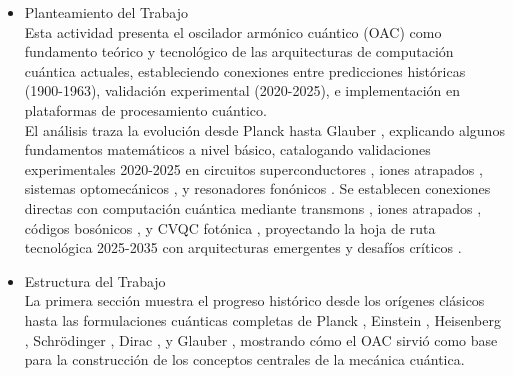 \documentclass[11pt,a4paper,spanish]{book}
\begin{document}
\begin{itemize}
Comprender los nuevos desarrollos que se han dado en el período 2020-2025, requiere entender y dominar el OAC como fundamento, objetivo central de este trabajo. Este periodo ha marcado una transición con desarrollos como: los códigos bosónicos han superado el punto de equilibrio en corrección de errores \cite{sivak2023, ni2023}, cat qubits han alcanzado tiempos de bit-flip superiores a 10 segundos \cite{reglade2024}, sistemas optomecánicos han enfriado osciladores a 0.04 fonones desde temperatura ambiente \cite{dania2025} y creado estados gato en resonadores de 16 microgramos \cite{bild2023}, y resonadores fonónicos han verificado directamente la cuantización de energía \cite{arrangoiz2019, hou2024}.\\ 

\item Planteamiento del Trabajo\\
Esta actividad presenta el oscilador armónico cuántico (OAC) como fundamento teórico y tecnológico de las arquitecturas de computación cuántica actuales, estableciendo conexiones entre predicciones históricas (1900-1963), validación experimental (2020-2025), e implementación en plataformas de procesamiento cuántico. \\

El análisis traza la evolución desde Planck \citep{planck1901} hasta Glauber \citep{glauber1963a}, explicando algunos fundamentos matemáticos a nivel básico, catalogando validaciones experimentales 2020-2025 en circuitos superconductores \citep{sivak2023, ni2023, reglade2024}, iones atrapados \citep{hou2024}, sistemas optomecánicos \citep{dania2025, bild2023}, y resonadores fonónicos \citep{arrangoiz2019, wollack2022}. Se establecen conexiones directas con computación cuántica mediante transmons \citep{koch2007, blais2021}, iones atrapados \citep{cirac1995, bruzewicz2019}, códigos bosónicos \citep{gkp2001, ofek2016, brady2024}, y CVQC fotónica \citep{braunstein2005, madsen2022}, proyectando la hoja de ruta tecnológica 2025-2035 con arquitecturas emergentes y desafíos críticos \citep{liu2024, eickbusch2024, chamberland2022}.

\item Estructura del Trabajo\\
La primera sección muestra el progreso histórico desde los orígenes clásicos \citep{hooke1678, lagrange1788, hamilton1834} hasta las formulaciones cuánticas completas de Planck \citep{planck1901}, Einstein \citep{einstein1907}, Heisenberg \citep{heisenberg1925}, Schrödinger \citep{schrodinger1926b}, Dirac \citep{dirac1930}, y Glauber \citep{glauber1963a}, mostrando cómo el OAC sirvió como base para la construcción de los conceptos centrales de la mecánica cuántica.\\


\end{itemize}
\end{document}
